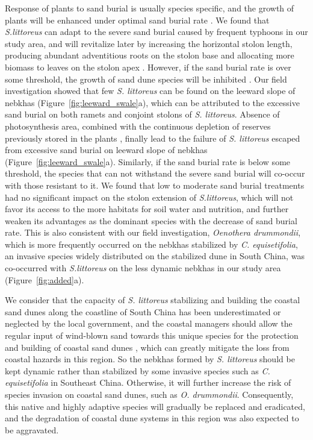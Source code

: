 \documentclass[]{interact}
\theoremstyle{plain}%
\theoremstyle{definition}
\theoremstyle{remark}
\begin{document}
Response of plants to sand burial is usually species specific, and the growth of plants will be enhanced under optimal sand burial rate \citep{noletUAVimagingModelGrowth2018}. We found that \textit{S.littoreus} can adapt to the severe sand burial caused by frequent typhoons in our study area, and will revitalize later by increasing the horizontal stolon length, producing abundant adventitious roots on the stolon base and allocating more biomass to leaves on the stolon apex \citep{yuanEffectsSandAccretion1993}. However, if the sand burial rate is over some threshold, the growth of sand dune species will be inhibited \citep{maunEffectsBurialSand1996, shiEffectsSandBurial2004}. Our field investigation showed that few \textit{S. littoreus} can be found on the leeward slope of nebkhas (Figure~\ref{fig:leeward_swale}a), which can be attributed to the excessive sand burial on both ramets and conjoint stolons of \textit{S. littoreus}. Absence of photosynthesis area, combined with the continuous depletion of reserves previously stored in the plants \citep{frosiniGlobalChangeResponse2012}, finally lead to the failure of \textit{S. littoreus} escaped from excessive sand burial on leeward slope of nebkhas (Figure~\ref{fig:leeward_swale}a).  Similarly, if the sand burial rate is below some threshold, the species that can not withstand the severe sand burial will co-occur with those resistant to it. We found that low to moderate sand burial treatments had no significant impact on the stolon extension of \textit{S.littoreus}, which will not favor its access to the more habitats for soil water and nutrition, and further weaken its advantages as the dominant species with the decrease of sand burial rate. This is also consistent with our field investigation, \textit{Oenothera drummondii}, which is more frequently occurred on the nebkhas stabilized by \textit{C. equisetifolia}, an invasive species widely distributed on the stabilized dune in South China, was co-occurred with \textit{S.littoreus} on the less dynamic nebkhas in our study area (Figure~\ref{fig:added}a).

We consider that the capacity of \textit{S. littoreus} stabilizing and building the coastal sand dunes along the coastline of South China has been  underestimated or neglected by the local government, and the coastal managers should allow the regular input of wind-blown sand towards this unique species for the protection and building of coastal sand dunes \citep{noletUAVimagingModelGrowth2018}, which can greatly mitigate the loss from coastal hazards in this region. So the nebkhas formed by \textit{S. littoreus} should be kept dynamic rather than stabilized by some invasive species such as \textit{C. equisetifolia} in Southeast China. Otherwise, it will further increase the risk of species invasion on coastal sand dunes, such as \textit{O. drummondii}. Consequently, this native and highly adaptive species will gradually be replaced and eradicated, and  the degradation of coastal dune systems in this region was also expected to be aggravated.
\end{document}
